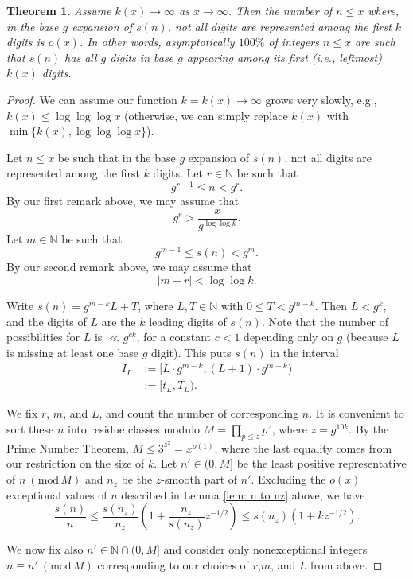 \documentclass[10pt,a4paper]{amsart}
\newtheorem{theorem}{Theorem}
\renewcommand{\bmod}[1]{\ ( \mathrm{mod} \, #1 )}
\begin{document}
	\begin{theorem}\label{thm:firstk}
	Assume $k(x)\to \infty$ as $x\to \infty$. 	
	Then the number of $n\leq x$ where, in the base $g$ expansion of $s(n)$, not all digits are represented among the first $k$ digits is $o(x)$. In other words, asymptotically $100\%$ of integers $n\leq x$ are such that $s(n)$ has all $g$ digits in base $g$ appearing among its first (i.e., leftmost) $k(x)$ digits.
	\end{theorem}

	\begin{proof}
    We can assume our function $k=k(x) \to \infty$ grows very slowly, e.g., $k(x) \leq \log\log\log x$ (otherwise, we can simply replace $k(x)$ with $\min\{k(x),\log\log\log x\}$).
     
Let $n\leq x$ be such that in the base $g$ expansion of $s(n)$, not all digits are represented among the first $k$ digits. Let $r\in \mathbb{N}$ be such that \[ g^{r-1}\leq n<g^r. \] By our first remark above, we may assume that \[ g^r>\frac{x}{g^{\log\log k}}.\] Let $m\in \mathbb{N}$ be such that  \[ g^{m-1}\leq s(n)<g^m.\] By our second remark above, we may assume  that 
\[ |m-r| < \log \log k. \] 

Write $s(n) = g^{m-k} L  + T$, where $L, T\in \mathbb{N}$ with $0\leq T< g^{m-k}$. Then $L < g^{k}$, and the digits of $L$ are the $k$ leading digits of $s(n)$. Note that the number of possibilities for $L$ is $\ll g^{ck}$, for a constant $c < 1$ depending only on $g$ (because $L$ is missing at least one base $g$ digit). This puts $s(n)$ in the interval  \begin{align*} I_L&:=[L\cdot g^{m-k},(L+1)\cdot g^{m-k}) \\&:=[t_L,T_L). \end{align*} 


We fix $r$, $m$, and $L$, and count the number of corresponding $n$. It is convenient to sort these $n$ into residue classes modulo $M = \prod_{p \leq z} p^{z}$, where $z = g^{10k}$. By the Prime Number Theorem, $M \leq 3^{z^2} =x^{o(1)}$, where the last equality comes from our restriction on the size of $k$. Let  $n'\in (0,M]$ be the least positive representative of $n \bmod M$  and $n_{z}$ be the $z$-smooth part of $n'$. Excluding the $o(x)$ exceptional values of $n$ described in Lemma \ref{lem: n to nz} above, we have $$\frac{s(n)}{n} \leq \frac{s(n_z)}{n_z} \left(1 +\frac{n_z}{s(n_z)}  z^{-1/2}\right) \leq {s(n_z)} (1 + k z^{-1/2}).$$ 
    
We now fix also $n'\in \mathbb{N}\cap (0,M]$ and consider only nonexceptional integers $n \equiv n' \bmod M$ corresponding to our  choices of $r$,$m$, and $L$ from above.


\end{proof}
\end{document}
